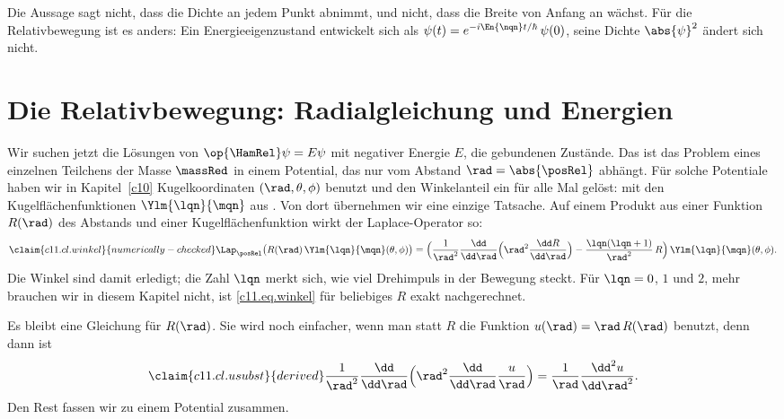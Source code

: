 \begin{vertiefung}
  Die Aussage sagt nicht, dass die Dichte an jedem Punkt abnimmt, und nicht, dass die
  Breite von Anfang an wächst. Für die Relativbewegung ist es anders: Ein
  Energieeigenzustand entwickelt sich als
  $\psi(t) = e^{-i\En{\nqn}t/\hbar}\,\psi(0)$, seine Dichte $\abs{\psi}^2$ ändert sich
  nicht.
\end{vertiefung}


\section{Die Relativbewegung: Radialgleichung und Energien}\label{c11.s4}

Wir suchen jetzt die Lösungen von
$\op{\HamRel}\psi = E\psi$ mit negativer Energie $E$, die gebundenen Zustände. Das ist das
Problem eines einzelnen Teilchens der Masse $\massRed$ in einem Potential, das nur vom
Abstand $\rad = \abs{\posRel}$ abhängt. Für solche Potentiale haben wir in
Kapitel~\ref{c10} Kugelkoordinaten $(\rad, \theta, \phi)$ benutzt und den Winkelanteil
ein für alle Mal gelöst: mit den Kugelflächenfunktionen $\Ylm{\lqn}{\mqn}$ aus
. Von dort übernehmen wir eine einzige Tatsache. Auf einem Produkt aus einer
Funktion $R(\rad)$ des Abstands und einer Kugelflächenfunktion wirkt der
Laplace-Operator so:
\begin{equation}\label{c11.eq.winkel}\claim{c11.cl.winkel}{numerically-checked}
  \Lap_{\posRel}\bigl(R(\rad)\,\Ylm{\lqn}{\mqn}(\theta, \phi)\bigr)
  = \Bigl(\frac{1}{\rad^2}\frac{\dd}{\dd\rad}\Bigl(\rad^2\frac{\dd R}{\dd\rad}\Bigr)
    - \frac{\lqn(\lqn + 1)}{\rad^2}\,R\Bigr)\,\Ylm{\lqn}{\mqn}(\theta, \phi).
\end{equation}
Die Winkel sind damit erledigt; die Zahl $\lqn$ merkt sich, wie viel Drehimpuls in der
Bewegung steckt. Für $\lqn = 0$, $1$ und $2$, mehr brauchen wir in diesem Kapitel nicht,
ist \eqref{c11.eq.winkel} für beliebiges $R$ exakt nachgerechnet.

Es bleibt eine Gleichung für $R(\rad)$. Sie wird noch einfacher, wenn man statt $R$ die
Funktion $u(\rad) = \rad\,R(\rad)$ benutzt, denn dann ist
\begin{equation}\label{c11.eq.usubst}\claim{c11.cl.usubst}{derived}
  \frac{1}{\rad^2}\frac{\dd}{\dd\rad}\Bigl(\rad^2\frac{\dd}{\dd\rad}\frac{u}{\rad}\Bigr)
  = \frac{1}{\rad}\frac{\dd^2 u}{\dd\rad^2} .
\end{equation}
Den Rest fassen wir zu einem Potential zusammen.


